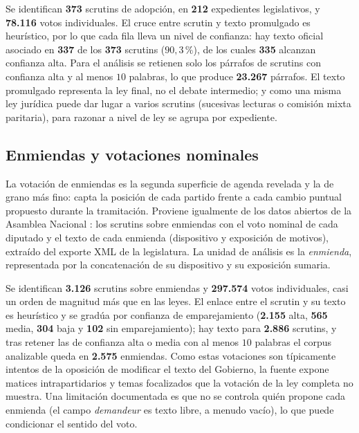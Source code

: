 Se identifican \textbf{373} scrutins de adopción, en \textbf{212} expedientes
legislativos, y \textbf{78.116} votos individuales. El cruce entre scrutin y
texto promulgado es heurístico, por lo que cada fila lleva un nivel de confianza:
hay texto oficial asociado en \textbf{337} de los \textbf{373} scrutins
($90{,}3\,\%$), de los cuales \textbf{335} alcanzan confianza alta. Para el
análisis se retienen solo los párrafos de scrutins con confianza alta y al menos
$10$ palabras, lo que produce \textbf{23.267} párrafos. El texto promulgado
representa la ley final, no el debate intermedio; y como una misma ley jurídica
puede dar lugar a varios scrutins (sucesivas lecturas o comisión mixta
paritaria), para razonar a nivel de ley se agrupa por expediente.

\subsection{Enmiendas y votaciones nominales}
\label{sec:corpus-enmiendas}

La votación de enmiendas es la segunda superficie de agenda revelada y la de
grano más fino: capta la posición de cada partido frente a cada cambio puntual
propuesto durante la tramitación. Proviene igualmente de los datos abiertos de la
Asamblea Nacional \cite{an_opendata_xv}: los scrutins sobre enmiendas con el voto
nominal de cada diputado y el texto de cada enmienda (dispositivo y exposición de
motivos), extraído del exporte XML de la legislatura. La unidad de análisis es la
\emph{enmienda}, representada por la concatenación de su dispositivo y su
exposición sumaria.

Se identifican \textbf{3.126} scrutins sobre enmiendas y \textbf{297.574} votos
individuales, casi un orden de magnitud más que en las leyes. El enlace entre el
scrutin y su texto es heurístico y se gradúa por confianza de emparejamiento
(\textbf{2.155} alta, \textbf{565} media, \textbf{304} baja y \textbf{102} sin
emparejamiento); hay texto para \textbf{2.886} scrutins, y tras retener las de
confianza alta o media con al menos $10$ palabras el corpus analizable queda en
\textbf{2.575} enmiendas. Como estas votaciones son típicamente intentos de la
oposición de modificar el texto del Gobierno, la fuente expone matices
intrapartidarios y temas focalizados que la votación de la ley completa no
muestra. Una limitación documentada es que no se controla quién propone cada
enmienda (el campo \emph{demandeur} es texto libre, a menudo vacío), lo que puede
condicionar el sentido del voto.

